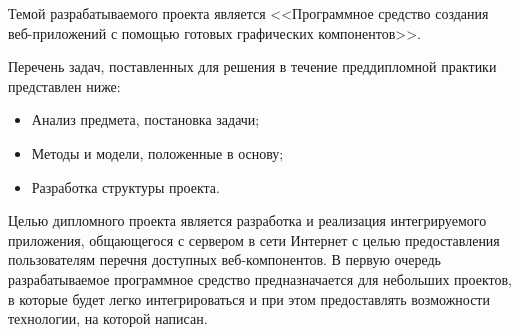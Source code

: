 Темой разрабатываемого проекта является <<Программное средство создания веб-приложений с помощью готовых графических компонентов>>. 

Перечень задач, поставленных для решения в течение преддипломной практики представлен ниже:

\begin{itemize}
    \item Анализ предмета, постановка задачи;
    \item Методы и модели, положенные в основу;
    \item Разработка структуры проекта. 
\end{itemize}


Целью дипломного проекта является разработка и реализация интегрируемого приложения, общающегося с сервером в сети Интернет с целью предоставления пользователям перечня доступных веб-компонентов. В первую очередь разрабатываемое программное средство предназначается для небольших проектов, в которые будет легко интегрироваться и при этом предоставлять возможности технологии, на которой написан.
